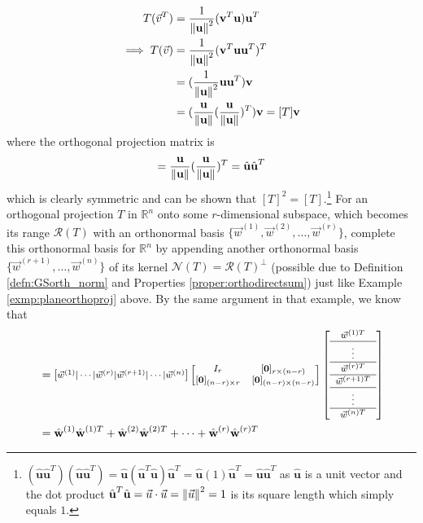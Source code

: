 \begin{align*}
T(\vec{v}^T) &= \frac{1}{\norm{\textbf{u}}^2}(\textbf{v}^T\textbf{u})\textbf{u}^T \\
\implies T(\vec{v}) &= \frac{1}{\norm{\textbf{u}}^2}(\textbf{v}^T\textbf{u}\textbf{u}^T)^T \\
&= (\frac{1}{\norm{\textbf{u}}^2}\textbf{u}\textbf{u}^T)\textbf{v} \\
&= (\frac{\textbf{u}}{\norm{\textbf{u}}}(\frac{\textbf{u}}{\norm{\textbf{u}}})^T)\textbf{v} = [T]\textbf{v}
\end{align*}
where the orthogonal projection matrix is 
\begin{align*}
[T] = \frac{\textbf{u}}{\norm{\textbf{u}}}(\frac{\textbf{u}}{\norm{\textbf{u}}})^T = \hat{\textbf{u}}\hat{\textbf{u}}^T    
\end{align*} which is clearly symmetric and can be shown that $[T]^2 = [T]$.\footnote{$(\hat{\textbf{u}}\hat{\textbf{u}}^T)(\hat{\textbf{u}}\hat{\textbf{u}}^T) = \hat{\textbf{u}}(\hat{\textbf{u}}^T\hat{\textbf{u}})\hat{\textbf{u}}^T = \hat{\textbf{u}}(1)\hat{\textbf{u}}^T = \hat{\textbf{u}}\hat{\textbf{u}}^T$ as $\hat{\textbf{u}}$ is a unit vector and the dot product $\hat{\textbf{u}}^T\hat{\textbf{u}} = \vec{u}\cdot\vec{u} = \norm{\vec{u}}^2 = 1$ is its square length which simply equals $1$.} For an orthogonal projection $T$ in $\mathbb{R}^n$ onto some $r$-dimensional subspace, which becomes its range $\mathcal{R}(T)$ with an orthonormal basis $\{\vec{w}^{(1)}, \vec{w}^{(2)}, \ldots, \vec{w}^{(r)}\}$, complete this orthonormal basis for $\mathbb{R}^n$ by appending another orthonormal basis $\{\vec{w}^{(r+1)}, \ldots, \vec{w}^{(n)}\}$ of its kernel $\mathcal{N}(T) = \mathcal{R}(T)^\perp$ (possible due to Definition \ref{defn:GSorth_norm} and Properties \ref{proper:orthodirectsum}) just like Example \ref{exmp:planeorthoproj} above. By the same argument in that example, we know that
\begin{align}
[T] &= 
\footnotesize
\begin{bmatrix}
\vec{w}^{(1)}|\cdots|\vec{w}^{(r)}|\vec{w}^{(r+1)}|\cdots|\vec{w}^{(n)}
\end{bmatrix}
\begin{bmatrix}
I_r & [\textbf{0}]_{r\times(n-r)} \\
[\textbf{0}]_{(n-r)\times r} & [\textbf{0}]_{(n-r)\times(n-r)} \\
\end{bmatrix}
\left[\begin{array}{c} 
\vec{w}^{(1)T} \\
\hline
\vdots \\
\hline
\vec{w}^{(r)T} \Tstrut \\
\hline
\vec{w}^{(r+1)T} \Tstrut\\
\hline 
\vdots \\
\hline
\vec{w}^{(n)T} \Tstrut
\end{array}\right] \nonumber \\
&= \hat{\textbf{w}}^{(1)}\hat{\textbf{w}}^{(1)T} + \hat{\textbf{w}}^{(2)}\hat{\textbf{w}}^{(2)T} + \cdots + \hat{\textbf{w}}^{(r)}\hat{\textbf{w}}^{(r)T} \label{eqn:projrank1sum}
\end{align}
